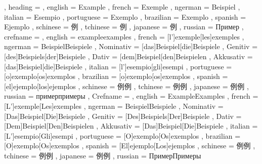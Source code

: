   {
    , heading =   {
                    , english     = Example
                    , french      = Exemple
                    , ngerman     = Beispiel
                    , italian     = Esempio
                    , portuguese  = Exemplo
                    , brazilian   = Exemplo
                    , spanish     = Ejemplo
                    , schinese    = 例
                    , tchinese    = 例
                    , japanese    = 例
                    , russian     = Пример
                  }
    , crefname =  {
                    , english     = {example}{examples}
                    , french      = [l']{exemple}[les]{exemples}
                    , ngerman     = { {Beispiel}{Beispiele}
                                      , Nominativ = [das]{Beispiel}[die]{Beispiele}
                                      , Genitiv   = [des]{Beispiels}[der]{Beispiele}
                                      , Dativ     = [dem]{Beispiel}[den]{Beispielen}
                                      , Akkusativ = [das]{Beispiel}[die]{Beispiele}
                                    }
                    , italian     = [l']{esempio}[gli]{esempi}
                    , portuguese  = [o]{exemplo}[os]{exemplos}
                    , brazilian   = [o]{exemplo}[os]{exemplos}
                    , spanish     = [el]{ejemplo}[los]{ejemplos}
                    , schinese    = {例}{例}
                    , tchinese    = {例}{例}
                    , japanese    = {例}{例}
                    , russian     = {пример}{примеры}
                  }
    , Crefname =  {
                    , english     = {Example}{Examples}
                    , french      = [L']{exemple}[Les]{exemples}
                    , ngerman     = { {Beispiel}{Beispiele}
                                      , Nominativ = [Das]{Beispiel}[Die]{Beispiele}
                                      , Genitiv   = [Des]{Beispiels}[Der]{Beispiele}
                                      , Dativ     = [Dem]{Beispiel}[Den]{Beispielen}
                                      , Akkusativ = [Das]{Beispiel}[Die]{Beispiele}
                                    }
                    , italian     = [L']{esempio}[Gli]{esempi}
                    , portuguese  = [O]{exemplo}[Os]{exemplos}
                    , brazilian   = [O]{exemplo}[Os]{exemplos}
                    , spanish     = [El]{ejemplo}[Los]{ejemplos}
                    , schinese    = {例}{例}
                    , tchinese    = {例}{例}
                    , japanese    = {例}{例}
                    , russian     = {Пример}{Примеры}
                  }
  }

